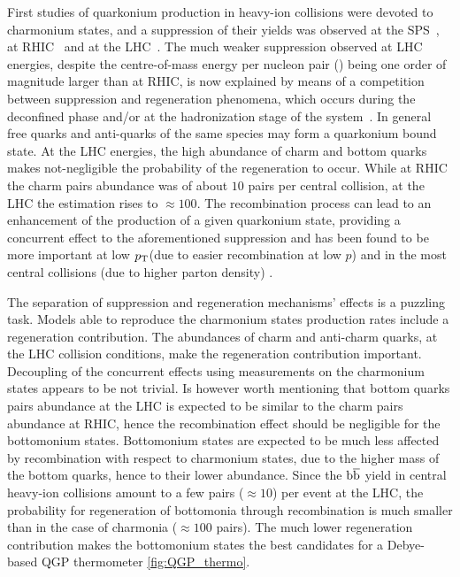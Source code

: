 First studies of quarkonium production in heavy-ion collisions were devoted to charmonium states, and a suppression of their yields was observed
at the SPS~\cite{abreu:in2p3-00002434,Alessandro:2004ap,Arnaldi:2007zz}, at RHIC~\cite{Adare:2011yf,Abelev:2009qaa} and at the LHC~\cite{Abelev:2012rv,Chatrchyan:2012np,Adam:2016rdg}. 
The much weaker \jpsi suppression observed at LHC energies, despite the centre-of-mass energy per nucleon pair (\snn) being one order of magnitude larger than at RHIC, is now explained by means of a competition between suppression and regeneration phenomena, which occurs during the deconfined phase and/or at the hadronization stage of the system~\cite{BraunMunzinger:2000px,Thews:2000rj,Zhao:2011cv,Zhou:2014kka}.
In general free quarks and anti-quarks of the same species may form a quarkonium bound state.
At the LHC energies, the high abundance of charm and bottom quarks  makes not-negligible the probability of the regeneration to occur.
While at RHIC the charm pairs abundance was of about $10$ pairs per central collision, at the LHC the estimation rises to $\approx 100$.
The recombination process can lead to an enhancement of the production of a given quarkonium state, providing a concurrent effect to the aforementioned suppression and has been found to be more important at low $p_{\rm T}$(due to easier recombination at low $p$) and in the most central collisions (due to higher parton density) \cite{Abelev:2013ila,Adam:2015isa}.

The separation of suppression and regeneration mechanisms' effects is a puzzling task.
Models able to reproduce the charmonium states production rates include a regeneration contribution.
The abundances of charm and anti-charm quarks, at the LHC collision conditions, make the regeneration contribution important.
Decoupling of the concurrent effects using measurements on the charmonium states appears to be not trivial.
Is however worth mentioning that bottom quarks pairs abundance at the LHC is expected to be similar to the charm pairs abundance at RHIC, hence the recombination effect should be negligible for the bottomonium states.
Bottomonium states are expected to be much less affected by recombination with respect to charmonium states, due to the higher mass of the bottom quarks, hence to their lower abundance.
Since the  ${\rm b{\overline b}}$ yield in central heavy-ion collisions amount to a few pairs ($\approx 10$) per event at the LHC, the probability for regeneration of bottomonia through recombination is much smaller than in the case of charmonia ($\approx 100$ pairs).
The much lower regeneration contribution makes the bottomonium states the best candidates for a Debye-based QGP thermometer \ref{fig:QGP_thermo}.

